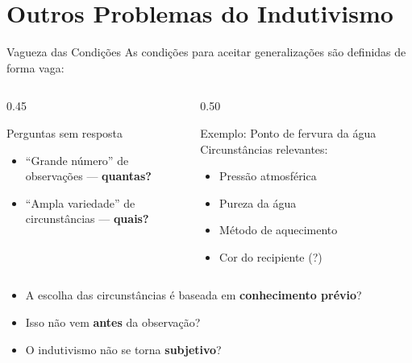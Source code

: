 \documentclass[aspectratio=169]{beamer}
\newcommand{\impt}[1]{\textcolor{maccent}{\textbf{#1}}}
\begin{document}
\section{Outros Problemas do Indutivismo}

\begin{frame}{Vagueza das Condições}
  As condições para aceitar generalizações são definidas de forma vaga:

  \vspace{0.3cm}
  \begin{columns}[T]
    \begin{column}{0.45\textwidth}
      \begin{alertblock}{Perguntas sem resposta}
        \begin{itemize}
          \item ``Grande número'' de observações --- \impt{quantas?}
          \item ``Ampla variedade'' de circunstâncias --- \impt{quais?}
        \end{itemize}
      \end{alertblock}
    \end{column}
    \begin{column}{0.50\textwidth}
      \begin{block}{Exemplo: Ponto de fervura da água}
        Circunstâncias relevantes:
        \begin{itemize}
          \item Pressão atmosférica
          \item Pureza da água
          \item Método de aquecimento
          \item Cor do recipiente (?)
        \end{itemize}
      \end{block}
    \end{column}
  \end{columns}

  \vspace{0.3cm}
  \pause
  \begin{itemize}
    \item A escolha das circunstâncias é baseada em \impt{conhecimento prévio}?
    \item Isso não vem \textbf{antes} da observação?
    \item O indutivismo não se torna \impt{subjetivo}?
  \end{itemize}
\end{frame}
\end{document}
